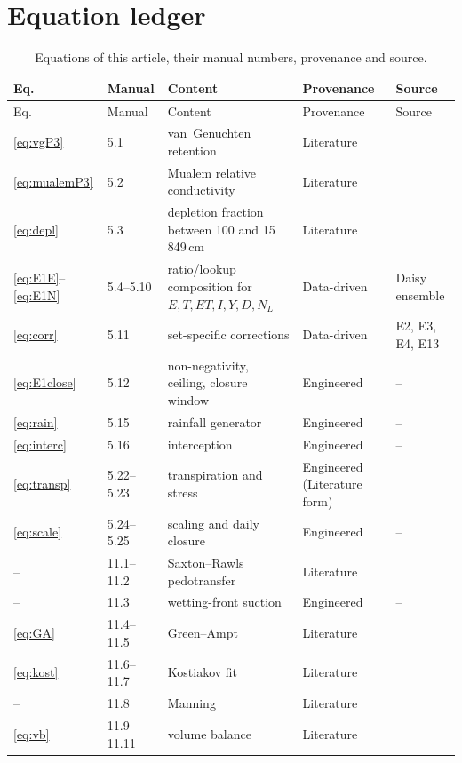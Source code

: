 \documentclass[preprint,12pt]{elsarticle}
\begin{document}
\section{Equation ledger}\label{app:ledger}
\begin{longtable}{p{1.7cm}p{1.6cm}p{4.9cm}p{2.2cm}p{3.4cm}}
\caption{Equations of this article, their manual numbers, provenance and source.}\\
\toprule
Eq. & Manual & Content & Provenance & Source\\\midrule\endfirsthead
\toprule Eq. & Manual & Content & Provenance & Source\\\midrule\endhead
\cref{eq:vgP3} & 5.1 & van~Genuchten retention & Literature & \cite{vanGenuchten1980}\\
\cref{eq:mualemP3} & 5.2 & Mualem relative conductivity & Literature & \cite{Mualem1976}\\
\cref{eq:depl} & 5.3 & depletion fraction between 100 and 15\,849\,cm & Literature & \cite{Allen1998}\\
\cref{eq:E1E}--\cref{eq:E1N} & 5.4--5.10 & ratio/lookup composition for $E,T,\mathit{ET},I,Y,D,N_L$ & Data-driven & Daisy ensemble\\
\cref{eq:corr} & 5.11 & set-specific corrections & Data-driven & E2, E3, E4, E13\\
\cref{eq:E1close} & 5.12 & non-negativity, ceiling, closure window & Engineered & --\\
\cref{eq:rain} & 5.15 & rainfall generator & Engineered & --\\
\cref{eq:interc} & 5.16 & interception & Engineered & --\\
\cref{eq:transp} & 5.22--5.23 & transpiration and stress & Engineered (Literature form) & \cite{Allen1998}\\
\cref{eq:scale} & 5.24--5.25 & scaling and daily closure & Engineered & --\\
-- & 11.1--11.2 & Saxton--Rawls pedotransfer & Literature & \cite{Saxton2006}\\
-- & 11.3 & wetting-front suction & Engineered & --\\
\cref{eq:GA} & 11.4--11.5 & Green--Ampt & Literature & \cite{GreenAmpt1911}\\
\cref{eq:kost} & 11.6--11.7 & Kostiakov fit & Literature & \cite{Kostiakov1932}\\
-- & 11.8 & Manning & Literature & \cite{Manning1891}\\
\cref{eq:vb} & 11.9--11.11 & volume balance & Literature & \cite{Walker1987,Elliott1982}\\

\end{longtable}
\end{document}
